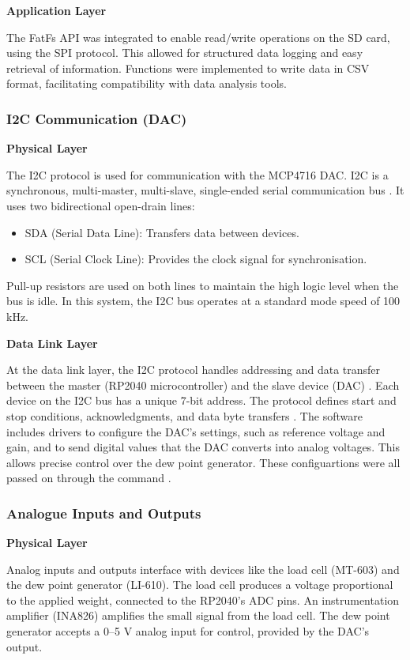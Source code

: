 \textbf{Application Layer}

The FatFs API was integrated to enable read/write operations on the SD card, 
using the SPI protocol. This allowed for structured data logging and easy retrieval of information. 
Functions were implemented to write data in CSV format, facilitating compatibility with data analysis tools.

\subsubsection{I2C Communication (DAC)}

\textbf{Physical Layer}

The I2C protocol is used for communication with the MCP4716 DAC. I2C is a synchronous, multi-master, 
multi-slave, single-ended serial communication bus \cite{DAC_datasheet}. It uses two bidirectional open-drain lines:
\begin{itemize}
    \item SDA (Serial Data Line): Transfers data between devices.
    \item SCL (Serial Clock Line): Provides the clock signal for synchronisation.
\end{itemize}
Pull-up resistors are used on both lines to maintain the high logic level when the bus is idle. 
In this system, the I2C bus operates at a standard mode speed of 100 kHz.

\textbf{Data Link Layer}

At the data link layer, the I2C protocol handles addressing and data transfer between the master 
(RP2040 microcontroller) and the slave device (DAC) \cite{DAC_datasheet}. Each device on the I2C bus has a unique 7-bit address. 
The protocol defines start and stop conditions, acknowledgments, and data byte transfers \cite{DAC_datasheet}. The software includes drivers to configure the DAC's settings, such as reference voltage and gain, and to send digital values that the DAC converts into analog voltages. This allows precise control over the dew point generator. These configuartions were all passed on through the  command \cite{DAC_datasheet}.

\subsubsection{Analogue Inputs and Outputs}

\textbf{Physical Layer}

Analog inputs and outputs interface with devices like the load cell (MT-603) and the dew point generator (LI-610). The load cell produces a voltage proportional to the applied weight, connected to the RP2040's ADC pins. An instrumentation amplifier (INA826) amplifies the small signal from the load cell. The dew point generator accepts a 0–5 V analog input for control, provided by the DAC's output.

